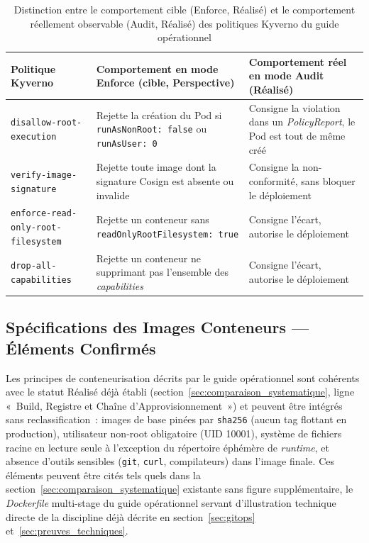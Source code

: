 \begin{table}[htbp]
\centering
\scriptsize
\begin{tabular}{@{}p{3.4cm}p{4.6cm}p{4.6cm}@{}}
\toprule
\textbf{Politique Kyverno} & \textbf{Comportement en mode Enforce (cible, Perspective)} & \textbf{Comportement réel en mode Audit (Réalisé)} \\
\midrule
\texttt{disallow-root-execution} & Rejette la création du Pod si \texttt{runAsNonRoot: false} ou \texttt{runAsUser: 0} & Consigne la violation dans un \textit{PolicyReport}, le Pod est tout de même créé \\
\texttt{verify-image-signature} & Rejette toute image dont la signature Cosign est absente ou invalide & Consigne la non-conformité, sans bloquer le déploiement \\
\texttt{enforce-read-only-root-filesystem} & Rejette un conteneur sans \texttt{readOnlyRootFilesystem: true} & Consigne l'écart, autorise le déploiement \\
\texttt{drop-all-capabilities} & Rejette un conteneur ne supprimant pas l'ensemble des \textit{capabilities} & Consigne l'écart, autorise le déploiement \\
\bottomrule
\end{tabular}
\caption{Distinction entre le comportement cible (Enforce, Réalisé) et le comportement réellement observable (Audit, Réalisé) des politiques Kyverno du guide opérationnel}
\label{tab:kyverno_correction}
\end{table}

\subsection{Spécifications des Images Conteneurs --- Éléments Confirmés}
\label{sub:images_confirmees}

Les principes de conteneurisation décrits par le guide opérationnel sont
cohérents avec le statut Réalisé déjà établi (section~\ref{sec:comparaison_systematique},
ligne «~Build, Registre et Chaîne d'Approvisionnement~») et peuvent être
intégrés sans reclassification~: images de base pinées par \texttt{sha256}
(aucun tag flottant en production), utilisateur non-root obligatoire (UID
10001), système de fichiers racine en lecture seule à l'exception du
répertoire éphémère de \textit{runtime}, et absence d'outils sensibles
(\texttt{git}, \texttt{curl}, compilateurs) dans l'image finale. Ces éléments
peuvent être cités tels quels dans la section~\ref{sec:comparaison_systematique}
existante sans figure supplémentaire, le \textit{Dockerfile} multi-stage du
guide opérationnel servant d'illustration technique directe de la discipline
déjà décrite en section~\ref{sec:gitops} et~\ref{sec:preuves_techniques}.

